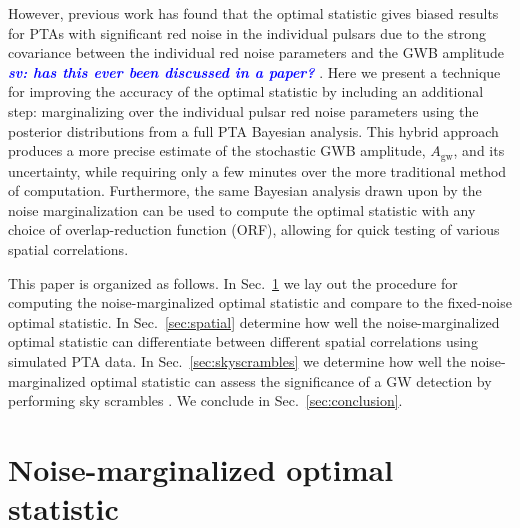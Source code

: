 \documentclass[twocolumn,aps,prd,superscriptaddress]{revtex4-1}
\newcommand{\sv}[1]{\textcolor{blue}{\it{\textbf{sv: #1}}} }
\newcommand{\Agw}{\ensuremath{A_\mathrm{gw}}}
\begin{document}
However, previous work has found that the optimal statistic gives biased results 
for PTAs with significant red noise in the individual pulsars due to the 
strong covariance between the individual red noise parameters 
and the GWB amplitude \sv{has this ever been discussed in a paper?}. 
Here we present a technique for improving the accuracy of the optimal statistic by including an additional step: marginalizing over the individual pulsar red noise parameters using the posterior distributions from a full PTA Bayesian analysis. This hybrid approach produces a more precise estimate of the stochastic GWB amplitude, 
\Agw\/, and its uncertainty, while requiring only a few minutes over the more traditional method of computation. 
Furthermore, the same Bayesian analysis drawn upon by the noise marginalization can be used to compute the optimal statistic with any choice of overlap-reduction function (ORF), allowing for quick testing of various spatial correlations. 

This paper is organized as follows. In Sec.~\ref{sec:marg_os} 
we lay out the procedure for computing the noise-marginalized optimal statistic 
and compare to the fixed-noise optimal statistic. 
In Sec.~\ref{sec:spatial} determine how well 
the noise-marginalized optimal statistic can 
differentiate between different spatial correlations 
using simulated PTA data. 
In Sec.~\ref{sec:skyscrambles} we determine how well the noise-marginalized optimal statistic 
can assess the significance of a GW detection by performing sky scrambles \citep{cs2016}. 
We conclude in Sec.~\ref{sec:conclusion}.


\section{Noise-marginalized optimal statistic}
\label{sec:marg_os}
\end{document}
